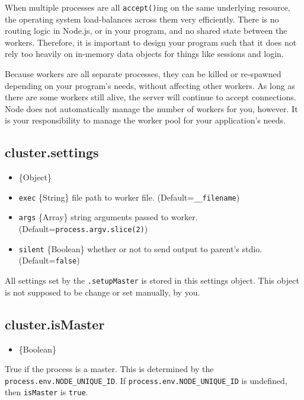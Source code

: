 When multiple processes are all \texttt{accept()}ing on the same
underlying resource, the operating system load-balances across them very
efficiently. There is no routing logic in Node.js, or in your program,
and no shared state between the workers. Therefore, it is important to
design your program such that it does not rely too heavily on in-memory
data objects for things like sessions and login.

Because workers are all separate processes, they can be killed or
re-spawned depending on your program's needs, without affecting other
workers. As long as there are some workers still alive, the server will
continue to accept connections. Node does not automatically manage the
number of workers for you, however. It is your responsibility to manage
the worker pool for your application's needs.

\subsection{cluster.settings}

\begin{itemize}
\item
  \{Object\}
\item
  \texttt{exec} \{String\} file path to worker file.
  (Default=\texttt{\_\_filename})
\item
  \texttt{args} \{Array\} string arguments passed to worker.
  (Default=\texttt{process.argv.slice(2)})
\item
  \texttt{silent} \{Boolean\} whether or not to send output to parent's
  stdio. (Default=\texttt{false})
\end{itemize}

All settings set by the \texttt{.setupMaster} is stored in this settings
object. This object is not supposed to be change or set manually, by
you.

\subsection{cluster.isMaster}

\begin{itemize}
\item
  \{Boolean\}
\end{itemize}

True if the process is a master. This is determined by the
\texttt{process.env.NODE\_UNIQUE\_ID}. If
\texttt{process.env.NODE\_UNIQUE\_ID} is undefined, then
\texttt{isMaster} is \texttt{true}.


